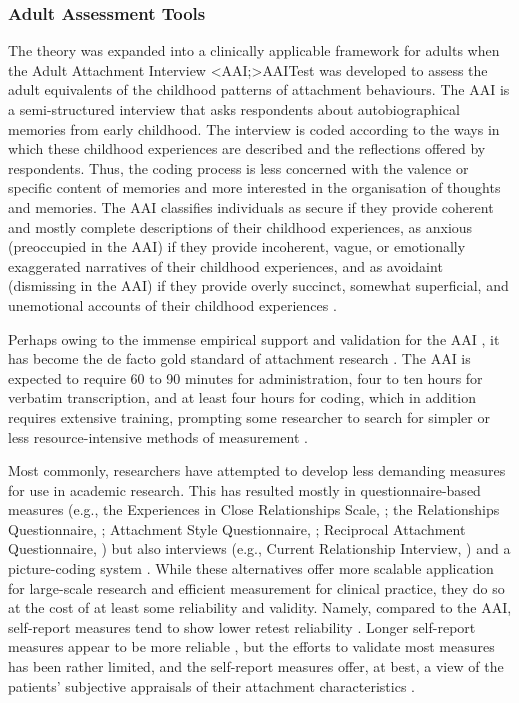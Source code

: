 \documentclass[12pt]{report}
\begin{document}
\subsubsection{Adult Assessment Tools}
The theory was expanded into a clinically applicable framework for adults when the Adult Attachment Interview \shortcite<AAI;>{AAITest} was developed to assess the adult equivalents of the childhood patterns of attachment behaviours.
The AAI is a semi-structured interview that asks respondents about autobiographical memories from early childhood.
The interview is coded according to the ways in which these childhood experiences are described and the reflections offered by respondents.
Thus, the coding process is less concerned with the valence or specific content of memories and more interested in the organisation of thoughts and memories.
The AAI classifies individuals as secure if they provide coherent and mostly complete descriptions of their childhood experiences,
as anxious (preoccupied in the AAI) if they provide incoherent, vague, or emotionally exaggerated narratives of their childhood experiences,
and as avoidaint (dismissing in the AAI) if they provide overly succinct, somewhat superficial, and unemotional accounts of their childhood experiences \cite{Hesse1999, AAITest}.

Perhaps owing to the immense empirical support and validation for the AAI \cite{BakermansKranenburg1993, IJzendoorn1995, Crowell1996Discriminant, Sagi1994}, it has become the de facto gold standard of attachment research .
The AAI is expected to require 60 to 90 minutes for administration, four to ten hours for verbatim transcription, and at least four hours for coding, which in addition requires extensive training, prompting some researcher to search for simpler or less resource-intensive methods of measurement .

Most commonly, researchers have attempted to develop less demanding measures for use in academic research.
This has resulted mostly in questionnaire-based measures (e.g., the Experiences in Close Relationships Scale, ; the Relationships Questionnaire, ; Attachment Style Questionnaire, ; Reciprocal Attachment Questionnaire, ) but also interviews (e.g., Current Relationship Interview, ) and a picture-coding system \cite{George2012}.
While these alternatives offer more scalable application for large-scale research and efficient measurement for clinical practice, they do so at the cost of at least some reliability and validity.
Namely, compared to the AAI, self-report measures tend to show lower retest reliability \cite{Scharfe1994}.
Longer self-report measures appear to be more reliable , but the efforts to validate most measures has been rather limited, and the self-report measures offer, at best, a view of the patients' subjective appraisals of their attachment characteristics \cite{Talia2017}.
\end{document}
